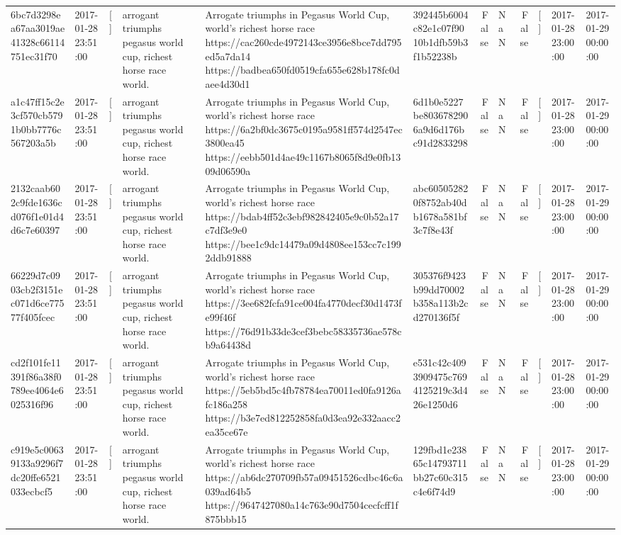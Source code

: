 \begin{tabular}{llllllrlrlll}
6bc7d3298ea67aa3019ae41328c66114751ec31f70 & 2017-01-28 23:51:00 & [] & arrogant triumphs pegasus world cup, richest horse race world. & Arrogate triumphs in Pegasus World Cup, world's richest horse race https://cac260cde4972143ce3956e8bce7dd795ed5a7da14 https://badbea650fd0519cfa655e628b178fc0daee4d30d1 & 392445b6004c82e1c07f9010b1dfb59b3f1b52238b & False & NaN & False & [] & 2017-01-28 23:00:00 & 2017-01-29 00:00:00 \\
a1c47ff15c2e3cf570cb5791b0bb7776c567203a5b & 2017-01-28 23:51:00 & [] & arrogant triumphs pegasus world cup, richest horse race world. & Arrogate triumphs in Pegasus World Cup, world's richest horse race https://6a2bf0dc3675c0195a9581ff574d2547ec3800ea45 https://eebb501d4ae49c1167b8065f8d9e0fb1309d06590a & 6d1b0e5227be8036782906a9d6d176bc91d2833298 & False & NaN & False & [] & 2017-01-28 23:00:00 & 2017-01-29 00:00:00 \\
2132caab602c9fde1636cd076f1e01d4d6c7e60397 & 2017-01-28 23:51:00 & [] & arrogant triumphs pegasus world cup, richest horse race world. & Arrogate triumphs in Pegasus World Cup, world's richest horse race https://bdab4ff52c3ebf982842405e9c0b52a17c7df3e9e0 https://bee1c9dc14479a09d4808ee153cc7c1992ddb91888 & abc605052820f8752ab40db1678a581bf3c7f8e43f & False & NaN & False & [] & 2017-01-28 23:00:00 & 2017-01-29 00:00:00 \\
66229d7c0903cb2f3151ec071d6ce77577f405fcec & 2017-01-28 23:51:00 & [] & arrogant triumphs pegasus world cup, richest horse race world. & Arrogate triumphs in Pegasus World Cup, world's richest horse race https://3ee682fcfa91ce004fa4770decf30d1473fe99f46f https://76d91b33de3cef3bebc58335736ae578cb9a64438d & 305376f9423b99dd70002b358a113b2cd270136f5f & False & NaN & False & [] & 2017-01-28 23:00:00 & 2017-01-29 00:00:00 \\
cd2f101fe11391f86a38f0789ee4064e6025316f96 & 2017-01-28 23:51:00 & [] & arrogant triumphs pegasus world cup, richest horse race world. & Arrogate triumphs in Pegasus World Cup, world's richest horse race https://5eb5bd5c4fb78784ea70011ed0fa9126afc186a258 https://b3e7ed812252858fa0d3ea92e332aacc2ea35ce67e & e531c42c4093909475c7694125219c3d426e1250d6 & False & NaN & False & [] & 2017-01-28 23:00:00 & 2017-01-29 00:00:00 \\
c919e5c00639133a9296f7dc20ffe6521033ecbcf5 & 2017-01-28 23:51:00 & [] & arrogant triumphs pegasus world cup, richest horse race world. & Arrogate triumphs in Pegasus World Cup, world's richest horse race https://ab6dc270709fb57a09451526cdbc46c6a039ad64b5 https://9647427080a14c763e90d7504cecfcff1f875bbb15 & 129fbd1e23865c14793711bb27c60c315c4e6f74d9 & False & NaN & False & [] & 2017-01-28 23:00:00 & 2017-01-29 00:00:00 \\

\end{tabular}
